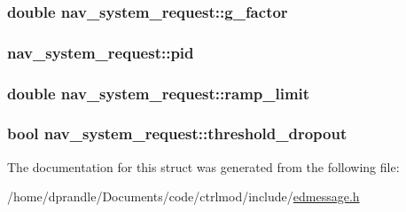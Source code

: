 \hypertarget{structnav__system__request_a3734a6a3991044e9f18e63d1f8405293}{
\subsubsection[{g\-\_\-factor}]{\setlength{\rightskip}{0pt plus 5cm}double nav\-\_\-system\-\_\-request\-::g\-\_\-factor}}\label{structnav__system__request_a3734a6a3991044e9f18e63d1f8405293}
\hypertarget{structnav__system__request_afaa3f6d1981d08595a44077e94f0ead5}{
\subsubsection[{pid}]{ nav\-\_\-system\-\_\-request\-::pid}}\label{structnav__system__request_afaa3f6d1981d08595a44077e94f0ead5}
\hypertarget{structnav__system__request_a168509fedd9762343017c1770812e93a}{
\subsubsection[{ramp\-\_\-limit}]{\setlength{\rightskip}{0pt plus 5cm}double nav\-\_\-system\-\_\-request\-::ramp\-\_\-limit}}\label{structnav__system__request_a168509fedd9762343017c1770812e93a}
\hypertarget{structnav__system__request_a37812000ff825a1a389e4ea00c8daa52}{
\subsubsection[{threshold\-\_\-dropout}]{\setlength{\rightskip}{0pt plus 5cm}bool nav\-\_\-system\-\_\-request\-::threshold\-\_\-dropout}}\label{structnav__system__request_a37812000ff825a1a389e4ea00c8daa52}


The documentation for this struct was generated from the following file\-:\begin{DoxyCompactItemize}
\item 
/home/dprandle/\-Documents/code/ctrlmod/include/\hyperlink{edmessage_8h}{edmessage.\-h}\end{DoxyCompactItemize}
